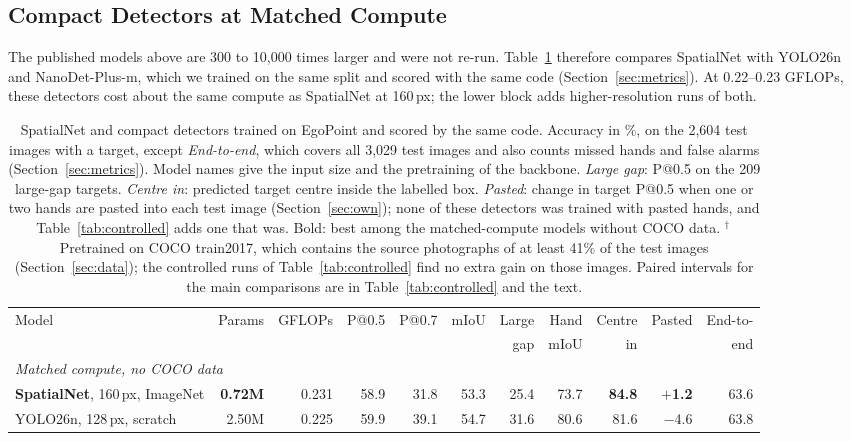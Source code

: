 \subsection{Compact Detectors at Matched Compute}\label{sec:detectors}

The published models above are 300 to 10{,}000 times larger and were not re-run. Table~\ref{tab:detectors} therefore compares SpatialNet with YOLO26n and NanoDet-Plus-m, which we trained on the same split and scored with the same code (Section~\ref{sec:metrics}). At 0.22--0.23 GFLOPs, these detectors cost about the same compute as SpatialNet at 160\,px; the lower block adds higher-resolution runs of both.

\begin{table}[t]
  \caption{SpatialNet and compact detectors trained on EgoPoint and scored by the same code. Accuracy in \%, on the 2,604 test images with a target, except \emph{End-to-end}, which covers all 3,029 test images and also counts missed hands and false alarms (Section~\ref{sec:metrics}). Model names give the input size and the pretraining of the backbone. \emph{Large gap}: P@0.5 on the 209 large-gap targets. \emph{Centre in}: predicted target centre inside the labelled box. \emph{Pasted}: change in target P@0.5 when one or two hands are pasted into each test image (Section~\ref{sec:own}); none of these detectors was trained with pasted hands, and Table~\ref{tab:controlled} adds one that was. Bold: best among the matched-compute models without COCO data. $^\dagger$\,Pretrained on COCO train2017, which contains the source photographs of at least 41\% of the test images (Section~\ref{sec:data}); the controlled runs of Table~\ref{tab:controlled} find no extra gain on those images. Paired intervals for the main comparisons are in Table~\ref{tab:controlled} and the text.}
  \label{tab:detectors}
  \footnotesize
  \setlength{\tabcolsep}{3pt}
  \begin{tabular}{lrrrrrrrrrr}
    \toprule
    Model & Params & GFLOPs & P@0.5 & P@0.7 & mIoU & Large & Hand & Centre & Pasted & End-to- \\
    & & & & & & gap & mIoU & in & & end \\
    \midrule
    \multicolumn{11}{l}{\emph{Matched compute, no COCO data}} \\
    \textbf{SpatialNet}, 160\,px, ImageNet & \textbf{0.72M} & 0.231 & 58.9 & 31.8 & 53.3 & 25.4 & 73.7 & \textbf{84.8} & \textbf{$+$1.2} & 63.6 \\
    YOLO26n, 128\,px, scratch & 2.50M & 0.225 & 59.9 & 39.1 & 54.7 & 31.6 & 80.6 & 81.6 & $-$4.6 & 63.8 \\

\end{tabular}
\end{table}
